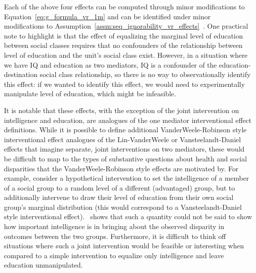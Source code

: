 Each of the above four effects can be computed through minor modifications to Equation~\ref{eq:g_formula_vr_1m}
and can be identified under minor modifications to
Assumption~\ref{assm:seq_ignorability_vr_effects}~\citep{jacksonvanderweele2018}. One practical note to highlight is 
that the effect of equalizing the marginal level of education between social classes requires that no confounders of 
the relationship between level of education and the unit's social class exist. However, in a situation where we have
IQ and education as two mediators, IQ is a confounder of the education-destination social class relationship, so 
there is no way to observationally identify this effect: if we wanted to identify this effect, we would need to 
experimentally manipulate level of education, which might be infeasible. 

It is notable that these 
effects, with the exception of the joint intervention on intelligence and education, are analogues of the 
one mediator interventional effect definitions. While it is possible to define additional VanderWeele-Robinson 
style interventional effect analogues of the Lin-VanderWeele or Vansteelandt-Daniel effects that imagine separate, 
joint interventions on two mediators, these would be difficult to map to the types of substantive questions about 
health and social disparities that the VanderWeele-Robinson style effects are motivated by. For example, consider 
a hypothetical intervention to set the intelligence of a member of a social group to a random level of a different
(advantaged) group, but to additionally intervene to draw their level of education from their own social group's 
marginal distribution (this would correspond to a Vansteelandt-Daniel style interventional effect).~\cite{miles2023} 
shows that such a quantity could not be said to show how important intelligence is in bringing about the observed
disparity in outcomes between the two groups. Furthermore, it is difficult to think off situations where such a 
joint intervention would be feasible or interesting when compared to a simple intervention to equalize only 
intelligence and leave education unmanipulated. 




